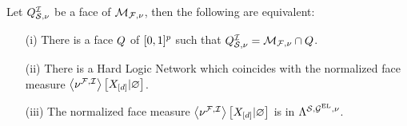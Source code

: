 \begin{theorem}
    \label{the:faceMeasureHardLogicNetworks}
    Let $Q^{\mathcal{I}}_{\mathcal{S},\nu}$ be a face of $\mathcal{M}_{\mathcal{F},\nu}$, then the following are equivalent:
    \begin{itemize}
        \item[(i)] There is a face $Q$ of $[0,1]^{p}$ such that $Q^{\mathcal{I}}_{\mathcal{S},\nu}=\mathcal{M}_{\mathcal{F},\nu}\cap Q$.
        \item[(ii)] There is a Hard Logic Network which coincides with the normalized face measure $\left\langle \nu^{\mathcal{F},\mathcal{I}}\right\rangle \left[ X_{[d]} | \varnothing \right]$.
        \item[(iii)] The normalized face measure $\left\langle \nu^{\mathcal{F},\mathcal{I}}\right\rangle \left[ X_{[d]} | \varnothing \right]$ is in $\Lambda^{\mathcal{S},\mathcal{G}^{\mathrm{EL}},\nu}$.
    \end{itemize}
\end{theorem}
